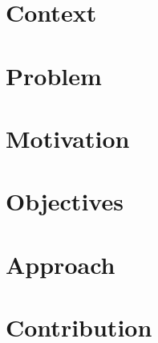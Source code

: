 



\section{Context}
\section{Problem}
\section{Motivation}
\section{Objectives}
\section{Approach}

\section{Contribution}


